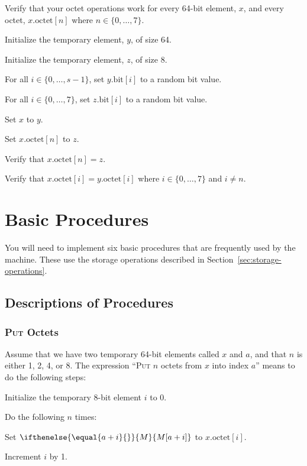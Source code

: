 \documentclass[a4paper,12pt]{article}
\newcommand{\MEM}[1]{\ifthenelse{\equal{#1}{}}{M}{M[#1]}}
\newcommand{\octno}[2]{#1.\mathrm{octet}[#2]}
\newcommand{\bitno}[2]{#1.\mathrm{bit}[#2]}
\newcommand{\range}[2]{\{#1,\ldots,#2\}}
\newcommand{\proc}[1]{\textsc{#1}}
\begin{document}
Verify that your octet operations work for every 64-bit element, $x$, and every octet, $\octno{x}{n}$ where $n \in \range{0}{7}$.
\begin{stepnumbers}
\item Initialize the temporary element, $y$, of size 64.
\item Initialize the temporary element, $z$, of size 8.
\item For all $i \in \range{0}{s-1}$, set $\bitno{y}{i}$ to a random bit value.
\item For all $i \in \range{0}{7}$, set $\bitno{z}{i}$ to a random bit value.
\item Set $x$ to $y$.
\item Set $\octno{x}{n}$ to $z$.
\item Verify that $\octno{x}{n} = z$.
\item Verify that $\octno{x}{i} = \octno{y}{i}$ where $i \in \range{0}{7}$ and $i \neq n$.
\end{stepnumbers}


\section{Basic Procedures}

You will need to implement six basic procedures that are frequently used by the machine.
These use the storage operations described in Section~\ref{sec:storage-operations}.

\subsection{Descriptions of Procedures}

\subsubsection{\proc{Put} Octets}

Assume that we have two temporary 64-bit elements called $x$ and $a$, and that $n$ is either 1, 2, 4, or 8.
The expression ``\proc{Put} $n$ octets from $x$ into index $a$'' means to do the following steps:
\begin{stepnumbers}
\item Initialize the temporary 8-bit element $i$ to 0.
\item Do the following $n$ times:
  \begin{stepletters}
  \item Set $\MEM{a+i}$ to $\octno{x}{i}$.
  \item Increment $i$ by 1.
  \end{stepletters}
\end{stepnumbers}
\end{document}
